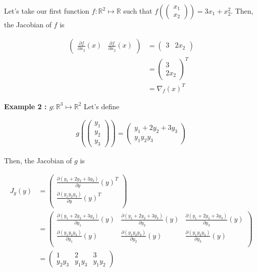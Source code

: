\documentclass{tufte-handout}
\begin{document}
Let's take our first function $ f : \mathbb{R}^2 \mapsto \mathbb{R} $ such that $ f(\begin{pmatrix}
 x_1 \\ x_2
 \end{pmatrix}) = 3x_1 + x_2^2 $. Then, the Jacobian of $ f $ is

\begin{align*}
\begin{pmatrix}
\frac{\partial f}{\partial x_2}(x) & \frac{\partial f}{\partial x_2}(x)
\end{pmatrix} &=
\begin{pmatrix}
3 & 2x_2
\end{pmatrix}\\
&= \begin{pmatrix}
3\\2x_2
\end{pmatrix}^T\\
&= \nabla_f (x)^T
\end{align*}

\textbf{Example 2 : $ g : \mathbb{R}^3 \mapsto \mathbb{R}^2 $}
 \label{example:jac2}
Let's define

\begin{align*}
g (\begin{pmatrix}
y_1\\y_2\\y_3
\end{pmatrix})
=\begin{pmatrix}
y_1 + 2y_2 + 3y_3\\ y_1y_2y_3
\end{pmatrix}
\end{align*}


Then, the Jacobian of $ g $ is

\begin{align*}
J_g(y) &=
\begin{pmatrix}
\frac{\partial (y_1 + 2y_2 + 3y_3)}{\partial y}(y)^T\\
\frac{\partial (y_1y_2y_3)}{\partial y}(y)^T\\
\end{pmatrix}\\
&=
\begin{pmatrix}
\frac{\partial (y_1 + 2y_2 + 3y_3)}{\partial y_1}(y) & \frac{\partial (y_1 + 2y_2 + 3y_3)}{\partial y_2}(y) & \frac{\partial (y_1 + 2y_2 + 3y_3)}{\partial y_3}(y)\\
\frac{\partial (y_1y_2y_3)}{\partial y_1}(y) & \frac{\partial (y_1y_2y_3)}{\partial y_2}(y) & \frac{\partial (y_1y_2y_3)}{\partial y_3}(y)\\
\end{pmatrix}\\
&=
\begin{pmatrix}
1 & 2 & 3\\
y_2y_3 &y_1y_3 & y_1y_2
\end{pmatrix}
\end{align*}
\end{document}
